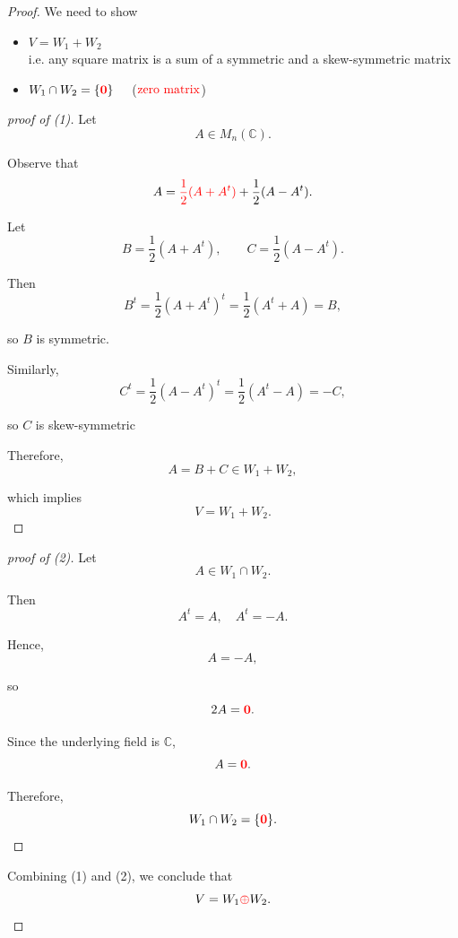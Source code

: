 \documentclass[12pt]{article}
\begin{document}
\begin{proof}
We need to show
\begin{itemize}
    \item[(1)]$V=W_1+W_2$\\
    i.e. any square matrix is a sum of a symmetric and a skew-symmetric matrix
    \item[(2)]$W_1\cap W_2=\{\textcolor{red}{\mathbf{0}}\} \quad$ ($\textcolor{red}{\text{zero matrix}}$) 
\end{itemize}

\medskip

\begin{proof}[proof of (1)]
Let
\[
A\in M_n(\mathbb C).
\]

Observe that
\[
A=\textcolor{red}{\frac12(A+A^t)}+\frac12(A-A^t).
\]

Let
\[
B=\frac12(A+A^t), \qquad C=\frac12(A-A^t).
\]

\newpage

Then
\[
B^t = \frac12(A+A^t)^t = \frac12(A^t+A) = B,
\]

so $B$ is symmetric.

\medskip

Similarly,
\[
C^t = \frac12(A-A^t)^t = \frac12(A^t-A) = -C,
\]

so $C$ is skew-symmetric

\medskip

Therefore,
\[
A=B+C\in W_1+W_2,
\]

which implies
\[
V=W_1+W_2.
\]

\end{proof}

\medskip

\begin{proof}[proof of (2)]
Let
\[
A\in W_1\cap W_2.
\]

Then
\[
A^t=A,\quad A^t=-A.
\]

Hence,
\[
A=-A,
\]

so
\[
2A=\textcolor{red}{\mathbf{0}}.
\]

Since the underlying field is $\mathbb C$,
\[
A=\textcolor{red}{\mathbf{0}}.
\]

Therefore,
\[
W_1\cap W_2=\{\textcolor{red}{\mathbf{0}}\}.
\]

\end{proof}

\medskip

Combining (1) and (2), we conclude that
\[
V=W_1 \textcolor{red}{\oplus} W_2.
\]

\end{proof}
\end{document}
